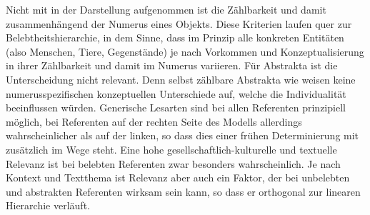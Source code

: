 Nicht mit in der Darstellung aufgenommen ist die Zählbarkeit und damit zusammenhängend der Numerus eines Objekts. Diese Kriterien laufen quer zur Belebtheitshierarchie, in dem Sinne, dass im Prinzip alle konkreten Entitäten (also Menschen, Tiere, Gegenstände) je nach Vorkommen und Konzeptualisierung in ihrer Zählbarkeit und damit im Numerus variieren. Für Abstrakta ist die Unterscheidung nicht relevant. Denn selbst zählbare Abstrakta wie  weisen keine numerusspezifischen konzeptuellen Unterschiede auf, welche die Individualität beeinflussen würden. Generische Lesarten sind bei allen Referenten prinzipiell möglich, bei Referenten auf der rechten Seite des Modells allerdings wahrscheinlicher als auf der linken, so dass dies einer frühen Determinierung mit  zusätzlich im Wege steht. Eine hohe gesellschaftlich-kulturelle und textuelle Relevanz ist bei belebten Referenten zwar besonders wahrscheinlich. Je nach Kontext und Textthema ist Relevanz aber auch ein Faktor, der bei unbelebten und abstrakten Referenten wirksam sein kann, so dass er orthogonal zur linearen Hierarchie verläuft. 
